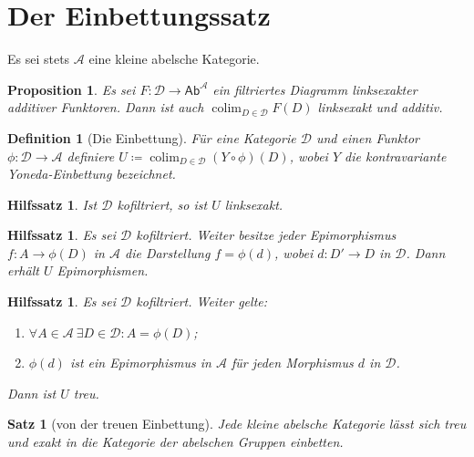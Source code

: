 \documentclass[a4paper, parskip=half]{scrartcl}
\theoremstyle{marginbreak}
\newtheorem{proposition}[remark]{Proposition}
\newtheorem{theorem}[remark]{Satz}
\newtheorem{lemma}[remark]{Hilfssatz}
\newtheorem{definition}[remark]{Definition}
\theoremstyle{nonumberplain}
\newcommand\ccat\mathsf
\newcommand\cat\mathcal
\DeclareMathOperator{\colim}{colim}
\begin{document}
	\section{Der Einbettungssatz}
		Es sei stets $\cat{A}$ eine kleine abelsche Kategorie.
		\begin{proposition}
			Es sei $F\colon\cat{D}\to\ccat{Ab}^{\cat{A}}$ ein filtriertes Diagramm
			linksexakter additiver Funktoren. Dann ist auch $\colim_{D\in\cat{D}} F(D)$
			linksexakt und additiv.
		\end{proposition}
		\begin{definition}[Die Einbettung]
			Für eine Kategorie $\cat{D}$ und einen Funktor $\phi\colon\cat{D}\to\cat{A}$
			definiere $U\coloneqq\colim_{D\in\cat{D}} (Y\circ\phi)(D)$, wobei $Y$ die
			kontravariante Yoneda-Einbettung bezeichnet.
		\end{definition}
		\begin{lemma}
			Ist $\cat{D}$ kofiltriert, so ist $U$ linksexakt.
		\end{lemma}
		\begin{lemma}
			Es sei $\cat{D}$ kofiltriert. Weiter besitze jeder Epimorphismus
			$f\colon A\to\phi(D)$ in $\cat{A}$ die Darstellung $f = \phi(d)$, wobei
			$d\colon D'\to D$ in $\cat{D}$. Dann erhält $U$ Epimorphismen.
		\end{lemma}
		\begin{lemma}
			Es sei $\cat{D}$ kofiltriert. Weiter gelte:
			\begin{enumerate}[label=(\arabic*)]
				\item $\forall A\in\cat{A}\ \exists D\in\cat{D}: A=\phi(D)$;
				\item $\phi(d)$ ist ein Epimorphismus in $\cat{A}$ für jeden Morphismus $d$ in $\cat{D}$.
			\end{enumerate}
			Dann ist $U$ treu.
		\end{lemma}
		\begin{theorem}[von der treuen Einbettung]\label{abeb}
			Jede kleine abelsche Kategorie lässt sich treu und exakt in die Kategorie
			der abelschen Gruppen einbetten.
		\end{theorem}
\end{document}
